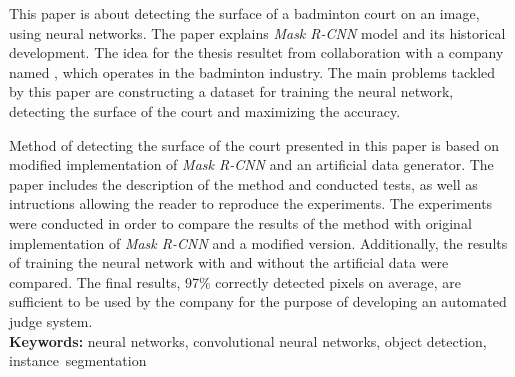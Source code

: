 
This paper is about detecting the surface of a badminton court on an image, using neural networks.
The paper explains \textit{Mask R-CNN} model and its historical development.
The idea for the thesis resultet from collaboration with a company named \blue{}, which operates in the badminton industry.
The main problems tackled by this paper are constructing a dataset for training the neural network, detecting the surface of the court and maximizing the accuracy.

Method of detecting the surface of the court presented in this paper is based on modified implementation of \textit{Mask R-CNN} and an artificial data generator. The paper includes the description of the method and conducted tests, as well as intructions allowing the reader to reproduce the experiments. The experiments were conducted in order to compare the results of the method with original implementation of \textit{Mask R-CNN} and a modified version. Additionally, the results of training the neural network with and without the artificial data were compared. The final results, 97\% correctly detected pixels on average, are sufficient to be used by the \blue{} company for the purpose of developing an automated judge system.
\\

\noindent \textbf{Keywords:} neural networks, convolutional neural networks, object detection, instance~segmentation
